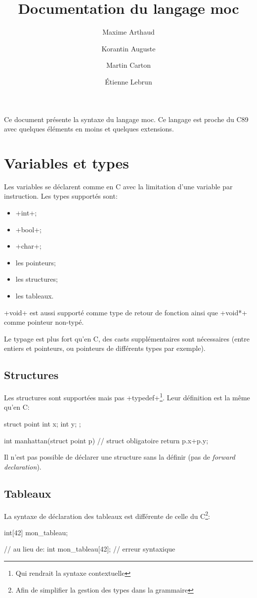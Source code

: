 \documentclass[a4paper]{article}
\author{
       Maxime Arthaud
  \and Korantin Auguste
  \and Martin Carton
  \and Étienne Lebrun
}
\title{Documentation du langage moc}
\begin{document}
  \maketitle
  \tableofcontents
  \newpage

  Ce document présente la syntaxe du langage moc. Ce langage est proche du C89
  avec quelques éléments en moins et quelques extensions.

  \section{Variables et types}
    Les variables se déclarent comme en C avec la limitation d'une variable par
    instruction. Les types supportés sont:
    \begin{itemize}
      \item \imoc+int+;
      \item \imoc+bool+;
      \item \imoc+char+;
      \item les pointeurs;
      \item les structures;
      \item les tableaux.
    \end{itemize}

    \imoc+void+ est aussi supporté comme type de retour de fonction ainsi que
    \imoc+void*+ comme pointeur non-typé.

    Le typage est plus fort qu'en C, des casts supplémentaires sont nécessaires
    (entre entiers et pointeurs, ou pointeurs de différents types par exemple).

    \subsection{Structures}
      Les structures sont supportées mais pas \imoc+typedef+\footnote{Qui
      rendrait la syntaxe contextuelle}. Leur définition est la même qu'en C:

      \begin{moc}
struct point {
    int x;
    int y;
};

int manhattan(struct point p) { // struct obligatoire
    return p.x+p.y;
}
      \end{moc}

      Il n'est pas possible de déclarer une structure sans la définir (pas de
      \emph{forward declaration}).

    \subsection{Tableaux}
      La syntaxe de déclaration des tableaux est différente de celle du
      C\footnote{Afin de simplifier la gestion des types dans la grammaire}:
      \begin{moc}
int[42] mon_tableau;

// au lieu de:
int mon_tableau[42]; // erreur syntaxique
      \end{moc}
\end{document}
